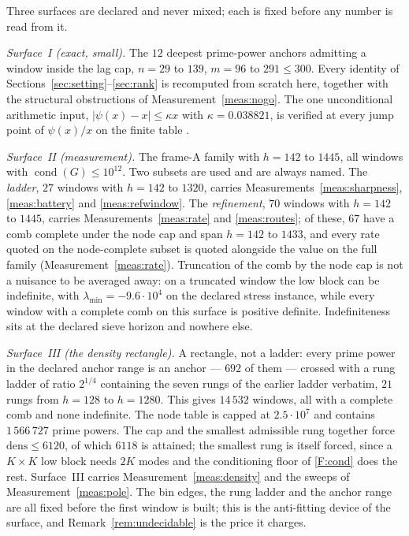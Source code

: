 \documentclass[11pt,a4paper]{article}
\theoremstyle{plain}
\theoremstyle{definition}
\newcommand{\lmin}{\lambda_{\min}}
\newcommand{\cond}{\operatorname{cond}}
\begin{document}
Three surfaces are declared and never mixed; each is fixed before any number is
read from it.

\emph{Surface~I (exact, small).} The $12$ deepest prime-power anchors admitting
a window inside the lag cap, $n=29$ to $139$, $m=96$ to $291\le300$. Every
identity of Sections~\ref{sec:setting}--\ref{sec:rank} is recomputed from
scratch here, together with the structural obstructions of
Measurement~\ref{meas:nogo}. The one unconditional arithmetic input,
$|\psi(x)-x|\le\kappa x$ with $\kappa=0.038821$, is verified at every jump point
of $\psi(x)/x$ on the finite table \cite{Chebyshev1852,RosserSchoenfeld1962}.

\emph{Surface~II (measurement).} The frame-A family with $h=142$ to $1445$, all
windows with $\cond(G)\le10^{12}$. Two subsets are used and are always named.
The \emph{ladder}, $27$ windows with $h=142$ to $1320$, carries
Measurements~\ref{meas:sharpness}, \ref{meas:battery} and \ref{meas:refwindow}.
The \emph{refinement}, $70$ windows with $h=142$ to $1445$, carries
Measurements~\ref{meas:rate} and \ref{meas:routes}; of these, $67$ have a comb
complete under the node cap and span $h=142$ to $1433$, and every rate quoted on
the node-complete subset is quoted alongside the value on the full family
(Measurement~\ref{meas:rate}). Truncation of the comb by the node cap is not a
nuisance to be averaged away: on a truncated window the low block can be
indefinite, with $\lmin=-9.6\cdot10^{4}$ on the declared stress instance, while
every window with a complete comb on this surface is positive definite.
Indefiniteness sits at the declared sieve horizon and nowhere else.

\emph{Surface~III (the density rectangle).} A rectangle, not a ladder: every
prime power in the declared anchor range is an anchor --- $692$ of them ---
crossed with a rung ladder of ratio $2^{1/4}$ containing the seven rungs of the
earlier ladder verbatim, $21$ rungs from $h=128$ to $h=1280$. This gives
$14\,532$ windows, all with a complete comb and none indefinite. The node table
is capped at $2.5\cdot10^{7}$ and contains $1\,566\,727$ prime powers. The cap
and the smallest admissible rung together force $\mathrm{dens}\le6120$, of which
$6118$ is attained; the smallest rung is itself forced, since a $K\times K$ low
block needs $2K$ modes and the conditioning floor of \ref{F:cond} does the rest.
Surface~III carries Measurement~\ref{meas:density} and the sweeps of
Measurement~\ref{meas:pole}. The bin edges, the rung ladder and the anchor range
are all fixed before the first window is built; this is the anti-fitting device
of the surface, and Remark~\ref{rem:undecidable} is the price it charges.
\end{document}
